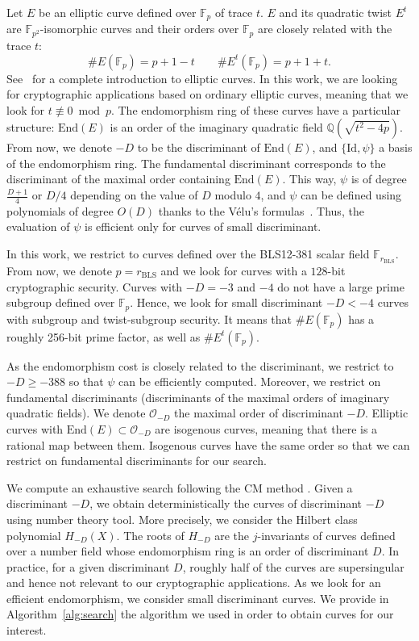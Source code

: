 \documentclass[smallextended]{svjour3}
\newcommand{\Q}{\ensuremath{\mathbb Q}}
\newcommand{\Fp}{\ensuremath{\mathbb F_p}}
\newcommand{\End}{\ensuremath{\text{End}}}
\begin{document}
Let $E$ be an elliptic curve defined over $\Fp$ of trace $t$. $E$ and
its quadratic twist $E^t$ are $\mathbb F_{p^2}$-isomorphic curves and
their orders over $\Fp$ are closely related with the trace
$t$:
$$\#E(\Fp) = p+1-t\qquad \#E^t(\Fp) = p+1+t.$$
See~\cite{Silverman86} for a complete introduction to elliptic curves.
In this work, we are looking for cryptographic applications based on
ordinary elliptic curves, meaning that we look for $t\not\equiv 0
\bmod p$. The endomorphism ring of these curves have a particular
structure: $\End(E)$ is an order of the imaginary quadratic field
$\Q(\sqrt{t^2-4p})$.
From now, we denote $-D$ to be the discriminant of $\End(E)$, and
$\{\text{Id},\psi\}$ a basis of the endomorphism ring.
The fundamental discriminant corresponds to the discriminant of the
maximal order containing $\End(E)$.
This way, $\psi$ is of degree $\frac{D+1}4$ or $D/4$ depending on the
value of $D$ modulo $4$, and $\psi$ can be defined using polynomials
of degree $O(D)$ thanks to the Vélu's formulas~\cite{velu71}.
Thus, the evaluation of $\psi$ is efficient only for curves of small
discriminant.

In this work, we restrict to curves defined over the BLS12-381 scalar
field $\mathbb F_{r_\text{BLS}}$. From now, we denote $p=r_\text{BLS}$
and we look for curves with a $128$-bit cryptographic security.
Curves with $-D=-3$ and $-4$ do not have a large prime subgroup
defined over $\Fp$.
Hence, we look for small discriminant $-D<-4$ curves with subgroup and
twist-subgroup security. It means that $\#E(\Fp)$ has a roughly 256-bit
prime factor, as well as $\#E^t(\Fp)$.

As the endomorphism cost is closely related to the discriminant, we
restrict to $-D \geq -388$ so that $\psi$ can be efficiently computed.
Moreover, we restrict on fundamental discriminants (discriminants
of the maximal orders of imaginary quadratic fields). We denote
$\mathcal O_{-D}$ the maximal order of discriminant $-D$. Elliptic
curves with $\End(E) \subset \mathcal O_{-D}$ are isogenous curves,
meaning that there is a rational map between them. Isogenous curves
have the same order so that we can restrict on fundamental
discriminants for our search.

We compute an exhaustive search following the CM method \cite{10.1007/3-540-58691-1_64,10.1007/3-540-46416-6_28}.
Given a discriminant $-D$, we obtain deterministically the curves of discriminant $-D$ using number theory tool.
More precisely, we consider the Hilbert class polynomial $H_{-D}(X)$. The roots of $H_{-D}$ are the $j$-invariants of curves defined over a number field whose endomorphism ring is an order of discriminant $D$.
In practice, for a given discriminant $D$, roughly half of the curves are supersingular and hence not relevant to our cryptographic applications.
As we look for an efficient endomorphism, we consider small discriminant curves. We provide in Algorithm~\ref{alg:search} the algorithm we used in order to obtain curves for our interest.
\end{document}
